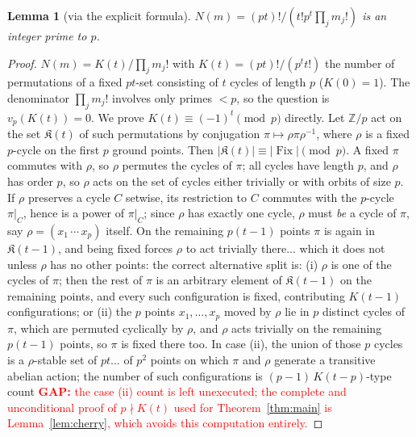 \documentclass[11pt]{amsart}
\newtheorem{lemma}[theorem]{Lemma}
\theoremstyle{definition}
\theoremstyle{remark}
\newcommand{\GAP}[1]{\textcolor{red}{\textbf{GAP: }#1}}
\newcommand{\Z}{\mathbb Z}
\newcommand{\Nn}{N}
\newcommand{\vp}{v_p}
\newcommand{\Kc}{K}
\DeclareMathOperator{\Fix}{Fix}
\begin{document}
\begin{lemma}[via the explicit formula]\label{lem:unit}
$\Nn(m)=(pt)!/(t!p^t\prod_jm_j!)$ is an integer prime to $p$.
\end{lemma}
\begin{proof}
$\Nn(m)=\Kc(t)/\prod_jm_j!$ with $\Kc(t)=(pt)!/(p^tt!)$ the number of
permutations of a fixed $pt$-set consisting of $t$ cycles of length $p$
($\Kc(0)=1$). The denominator $\prod_jm_j!$ involves only primes $<p$, so the
question is $\vp(\Kc(t))=0$. We prove $\Kc(t)\equiv(-1)^t\pmod p$ directly.
Let $\Z/p$ act on the set $\mathfrak K(t)$ of such permutations by
conjugation $\pi\mapsto\rho\pi\rho^{-1}$, where $\rho$ is a fixed $p$-cycle
on the first $p$ ground points. Then $|\mathfrak K(t)|\equiv
|\Fix|\pmod p$. A fixed $\pi$ commutes with $\rho$, so $\rho$ permutes the
cycles of $\pi$; all cycles have length $p$, and $\rho$ has order $p$, so
$\rho$ acts on the set of cycles either trivially or with orbits of size $p$.
If $\rho$ preserves a cycle $C$ setwise, its restriction to $C$ commutes with
the $p$-cycle $\pi|_C$, hence is a power of $\pi|_C$; since $\rho$ has
exactly one cycle, $\rho$ must \emph{be} a cycle of $\pi$, say
$\rho=(x_1\,\cdots\,x_p)$ itself. On the remaining $p(t-1)$ points $\pi$ is
again in $\mathfrak K(t-1)$, and being fixed forces $\rho$ to act trivially
there... which it does not unless $\rho$ has no other points: the correct
alternative split is: (i) $\rho$ is one of the cycles of $\pi$; then the rest
of $\pi$ is an arbitrary element of $\mathfrak K(t-1)$ on the remaining
points, and every such configuration is fixed, contributing $\Kc(t-1)$
configurations; or (ii) the $p$ points $x_1,\dots,x_p$ moved by $\rho$ lie in
$p$ distinct cycles of $\pi$, which are permuted cyclically by $\rho$, and
$\rho$ acts trivially on the remaining $p(t-1)$ points, so $\pi$ is fixed
there too. In case (ii), the union of those $p$ cycles is a $\rho$-stable set
of $pt$... of $p^2$ points on which $\pi$ and $\rho$ generate a transitive
abelian action; the number of such configurations is $(p-1)\,\Kc(t-p)$-type
count \GAP{the case (ii) count is left unexecuted; the complete and
unconditional proof of $p\nmid\Kc(t)$ used for Theorem~\ref{thm:main} is
Lemma~\ref{lem:cherry}, which avoids this computation entirely.}
\end{proof}
\end{document}
